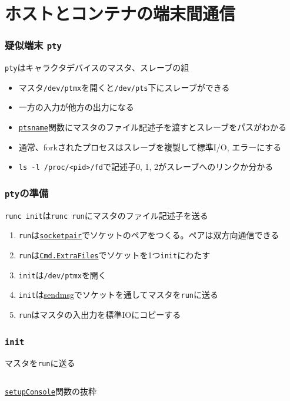 \documentclass[unicode, 14pt, aspectratio=169]{beamer}
\begin{document}
\section{ホストとコンテナの端末間通信}
\begin{frame}
  \frametitle{疑似端末 \texttt{pty}}
  \texttt{pty}はキャラクタデバイスのマスタ、スレーブの組\supercite{pty}
  \begin{itemize}[leftmargin=0.8cm,label=$\circ$]
  \item マスタ\texttt{/dev/ptmx}を開くと\texttt{/dev/pts}下にスレーブができる
  \item 一方の入力が他方の出力になる
  \item \href{https://man7.org/linux/man-pages/man3/ptsname.3.html}{\texttt{ptsname}}関数にマスタのファイル記述子を渡すとスレーブをパスがわかる
  \item 通常、forkされたプロセスはスレーブを複製して標準I/O, エラーにする\supercite{advancedunix}
  \item \texttt{ls -l /proc/<pid>/fd}で記述子0, 1, 2がスレーブへのリンクか分かる
  \end{itemize}
\end{frame}
\begin{frame}
  \frametitle{\texttt{pty}の準備}
  \texttt{runc init}は\texttt{runc run}にマスタのファイル記述子を送る
  \begin{enumerate}[leftmargin=1.2cm]
  \item \texttt{run}は\href{https://man7.org/linux/man-pages/man2/socketpair.2.html}{\texttt{socketpair}}でソケットのペアをつくる。ペアは双方向通信できる
  \item \texttt{run}は\href{https://pkg.go.dev/os/exec\#Cmd}{\texttt{Cmd.ExtraFiles}}でソケットを1つ\texttt{init}にわたす 
  \item \texttt{init}は\texttt{/dev/ptmx}を開く
  \item \texttt{init}は\href{https://man7.org/linux/man-pages/man3/sendmsg.3p.html}{sendmsg}でソケットを通してマスタを\texttt{run}に送る
  \item \texttt{run}はマスタの入出力を標準IOにコピーする
  \end{enumerate}
\end{frame}
\begin{frame}
  \frametitle{\texttt{init}}
  マスタを\texttt{run}に送る
  \begin{center}
    \inputminted{go}{code/tty_init.go}
    \href{https://github.com/opencontainers/runc/blob/7cb363254b69e10320360b63fb73e0ffb5da7bf2/libcontainer/init_linux.go\#L371}{\texttt{setupConsole}}関数の抜粋
  \end{center}
\end{frame}
\end{document}
